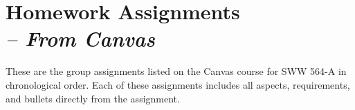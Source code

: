 \appendix
\chapter{Homework Assignments \\
\small{\textit{-- From Canvas}}
\label{Appendix::Homework}}

These are the group assignments listed on the Canvas course for SWW 564-A in chronological order. Each of these assignments includes all aspects, requirements, and bullets directly from the assignment.





